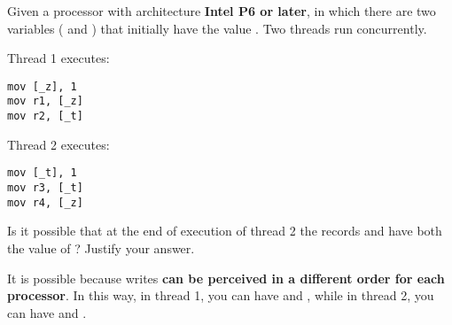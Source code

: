 \begin{acexercise}\end{acexercise}

Given a processor with architecture \textbf{Intel P6 or later}, in which
there are two variables ( and ) that initially have the value
. Two threads run concurrently.


Thread 1 executes:
\begin{lstlisting}[language={[x86masm]Assembler},basicstyle=\normalsize]
mov [_z], 1
mov r1, [_z]
mov r2, [_t]
\end{lstlisting}

Thread 2 executes:
\begin{lstlisting}[language={[x86masm]Assembler},basicstyle=\normalsize]
mov [_t], 1
mov r3, [_t]
mov r4, [_z]
\end{lstlisting}

Is it possible that at the end of execution of thread 2 the records  and 
have both the value of ? Justify your answer.

\begin{acsolution}\end{acsolution}

It is possible because writes \textbf{can be perceived in a different order
for each processor}. In this way, in thread 1, you can have  and
, while in thread 2, you can have  and
.
